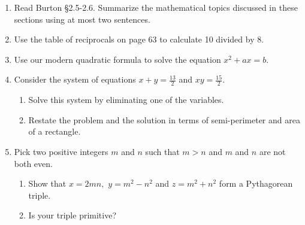 \documentclass[12pt]{article}
\begin{document}
\begin{enumerate}
\item Read Burton \S 2.5-2.6. Summarize the mathematical topics discussed in these sections using at most two sentences.
\vspace{1in}
\item Use the table of reciprocals on page 63 to calculate 10 divided by 8.
\vfill
\item Use our modern quadratic formula to solve the equation $x^2+ax=b.$\\
\vfill
\item Consider the system of equations $x+y=\frac{13}{2}$ and $xy=\frac{15}{2}$.
	\begin{enumerate}
	\item Solve this system by eliminating one of the variables.
	\vfill
	\item Restate the problem and the solution in terms of semi-perimeter and area of a rectangle.
	\vfill
	\end{enumerate}
\item Pick two positive integers $m$ and $n$ such that $m>n$ and $m$ and $n$ are not both even.
	\begin{enumerate}
	\item Show that $x=2mn,$ $y=m^2-n^2$ and $z=m^2+n^2$ form a Pythagorean triple.
	\vfill
	\item Is your triple primitive?
	\vfill
	\end{enumerate}
\end{enumerate}
\end{document}
